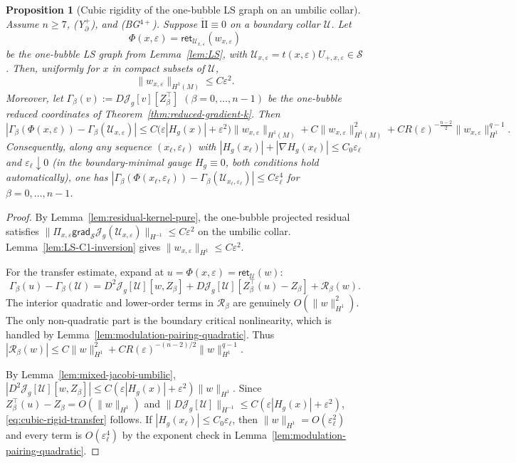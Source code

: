 \documentclass[11pt,reqno,a4paper]{amsart}
\numberwithin{equation}{section}
\theoremstyle{plain}
\newtheorem{proposition}[theorem]{Proposition}
\theoremstyle{remark}
\theoremstyle{plain}
\begin{document}
\begin{proposition}[Cubic rigidity of the one-bubble LS graph on an umbilic collar]
\label{prop:cubic-rigid-umbilic}
Assume $n\ge7$, \textup{(Y$^+_{\partial}$)}, and \textup{(BG$^{4+}$)}.
Suppose $\mathring{\mathrm{II}}\equiv0$ on a boundary collar $\mathcal U$.
Let
\[
\Phi(x,\varepsilon)=\mathsf{ret}_{\mathcal U_{x,\varepsilon}}(w_{x,\varepsilon})
\]
be the one-bubble LS graph from Lemma~\ref{lem:LS}, with
$\mathcal U_{x,\varepsilon}=t(x,\varepsilon)U_{+,x,\varepsilon}\in\mathcal S$.
Then, uniformly for $x$ in compact subsets of $\mathcal U$,
\[
\|w_{x,\varepsilon}\|_{H^1(M)}\le C\varepsilon^2.
\]
Moreover, let
$\Gamma_\beta(v):=D\mathcal J_g[v][Z_\beta^{\top}]$
$(\beta=0,\dots,n-1)$
be the one-bubble reduced coordinates of Theorem~\ref{thm:reduced-gradient-k}.
Then
\begin{equation}\label{eq:cubic-rigid-transfer}
|\Gamma_\beta(\Phi(x,\varepsilon))-\Gamma_\beta(\mathcal U_{x,\varepsilon})|
\le C\bigl(\varepsilon |H_g(x)|+\varepsilon^2\bigr)\|w_{x,\varepsilon}\|_{H^1(M)}
+ C\|w_{x,\varepsilon}\|_{H^1(M)}^2
+ C R(\varepsilon)^{-\frac{n-2}{2}}\|w_{x,\varepsilon}\|_{H^1}^{q-1}.
\end{equation}
Consequently, along any sequence $(x_\ell,\varepsilon_\ell)$ with
$|H_g(x_\ell)|+|\nabla H_g(x_\ell)|\le C_0\varepsilon_\ell$
and $\varepsilon_\ell\downarrow0$
(in the boundary-minimal gauge $H_g\equiv0$, both conditions hold automatically),
one has
$|\Gamma_\beta(\Phi(x_\ell,\varepsilon_\ell))-\Gamma_\beta(\mathcal U_{x_\ell,\varepsilon_\ell})|
\le C\varepsilon_\ell^4$
for $\beta=0,\dots,n-1$.
\end{proposition}

\begin{proof}
By Lemma~\ref{lem:residual-kernel-pure}, the one-bubble projected residual satisfies
$\|\Pi_{x,\varepsilon}\mathsf{grad}_{\mathcal S}\mathcal J_g(\mathcal U_{x,\varepsilon})\|_{H^{-1}}
\le C\varepsilon^2$
on the umbilic collar.  Lemma~\ref{lem:LS-C1-inversion} gives
$\|w_{x,\varepsilon}\|_{H^1}\le C\varepsilon^2$.

For the transfer estimate, expand at $u=\Phi(x,\varepsilon)=\mathsf{ret}_{\mathcal U}(w)$:
\[
\Gamma_\beta(u)-\Gamma_\beta(\mathcal U)
=
D^2\mathcal J_g[\mathcal U][w,Z_\beta]
+
D\mathcal J_g[\mathcal U][Z_\beta^{\top}(u)-Z_\beta]
+\mathcal R_\beta(w).
\]
The interior quadratic and lower-order terms in $\mathcal R_\beta$ are
genuinely $O(\|w\|_{H^1}^2)$.  The only non-quadratic part is the boundary
critical nonlinearity, which is handled by
Lemma~\ref{lem:modulation-pairing-quadratic}.  Thus
$|\mathcal R_\beta(w)|\le C\|w\|_{H^1}^2
+CR(\varepsilon)^{-(n-2)/2}\|w\|_{H^1}^{q-1}$.

By Lemma~\ref{lem:mixed-jacobi-umbilic},
$|D^2\mathcal J_g[\mathcal U][w,Z_\beta]|
\le C(\varepsilon |H_g(x)|+\varepsilon^2)\|w\|_{H^1}$.
Since $Z_\beta^{\top}(u)-Z_\beta=O(\|w\|_{H^1})$ and
$\|D\mathcal J_g[\mathcal U]\|_{H^{-1}}
\le C(\varepsilon |H_g(x)|+\varepsilon^2)$,
\eqref{eq:cubic-rigid-transfer} follows.
If $|H_g(x_\ell)|\le C_0\varepsilon_\ell$, then
$\|w\|_{H^1}=O(\varepsilon_\ell^2)$ and every term is $O(\varepsilon_\ell^4)$
by the exponent check in Lemma~\ref{lem:modulation-pairing-quadratic}.
\end{proof}
\end{document}
